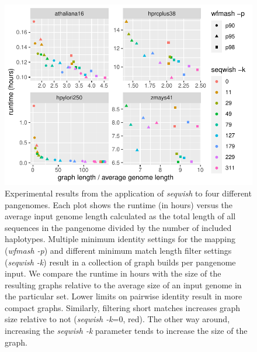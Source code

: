 \begin{figure}[b]
   \includegraphics[width=\linewidth, trim=0.4cm 0cm 0.4cm 1cm]{fig_experiment_stats}
   \caption{
     Experimental results from the application of \textit{seqwish} to four different pangenomes.
     Each plot shows the runtime (in hours) versus the average input genome length calculated as the total length of all sequences in the pangenome divided by the number of included haplotypes.
     Multiple minimum identity settings for the mapping (\textit{wfmash -p}) and different minimum match length filter settings (\textit{seqwish -k}) result in a collection of graph builds per pangenome input.
     We compare the runtime in hours with the size of the resulting graphs relative to the average size of an input genome in the particular set.
     Lower limits on pairwise identity result in more compact graphs.
     Similarly, filtering short matches increases graph size relative to not (\textit{seqwish -k}=0, red).
     The other way around, increasing the \textit{seqwish -k} parameter tends to increase the size of the graph.
    }
    \label{fig:experiments}
\end{figure}

